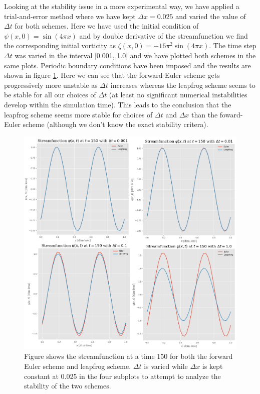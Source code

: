 \documentclass[12pt]{article}
\numberwithin{figure}{section}
\numberwithin{table}{section}
\begin{document}
\noindent Looking at the stability issue in a more experimental way, we have applied a trial-and-error method where we have kept $\Delta x=0.025$ and varied the value of $\Delta t$ for both schemes. Here we have used the initial condition of $\psi(x,0) = \sin(4 \pi x)$ and by double derivative of the streamfunction we find the corresponding initial vorticity as $\zeta(x,0) = -16 \pi^2 \sin(4 \pi x)$. The time step $\Delta t$ was varied in the interval [0.001, 1.0] and we have plotted both schemes in the same plots. Periodic boundary conditions have been imposed and the results are shown in figure \ref{fig:combi_dt}. Here we can see that the forward Euler scheme gets progressively more unstable as $\Delta t$ increases whereas the leapfrog scheme seems to be stable for all our choices of $\Delta t$ (at least no significant numerical instabilities develop within the simulation time). This leads to the conclusion that the leapfrog scheme seems more stable for choices of $\Delta t$ and $\Delta x$ than the foward-Euler scheme (although we don't know the exact stability critera).\\

\begin{figure}[ht]
 \centerline{\includegraphics[scale = 0.37]{psi_1d_dt_combined.png}}
 \caption{Figure shows the streamfunction at a time 150 for both the forward Euler scheme and leapfrog scheme. $\Delta t$ is varied while $\Delta x$ is kept constant at 0.025 in the four subplots to attempt to analyze the stability of the two schemes.}
 \label{fig:combi_dt}
\end{figure}
\end{document}
